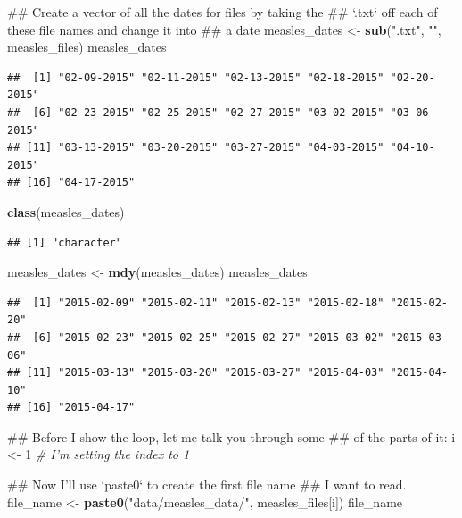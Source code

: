 \documentclass[]{book}
\makeatletter
\newenvironment{Shaded}{\begin{snugshade}}{\end{snugshade}}
\newcommand{\KeywordTok}[1]{\textcolor[rgb]{0.13,0.29,0.53}{\textbf{{#1}}}}
\newcommand{\DecValTok}[1]{\textcolor[rgb]{0.00,0.00,0.81}{{#1}}}
\newcommand{\StringTok}[1]{\textcolor[rgb]{0.31,0.60,0.02}{{#1}}}
\newcommand{\CommentTok}[1]{\textcolor[rgb]{0.56,0.35,0.01}{\textit{{#1}}}}
\newcommand{\NormalTok}[1]{{#1}}
\newenvironment{kframe}{%
\medskip{}
\setlength{\fboxsep}{.8em}
 \def\at@end@of@kframe{}%
 \ifinner\ifhmode%
  \def\at@end@of@kframe{\end{minipage}}%
  \begin{minipage}{\columnwidth}%
 \fi\fi%
 \def\FrameCommand##1{\hskip\@totalleftmargin \hskip-\fboxsep
 \colorbox{shadecolor}{##1}\hskip-\fboxsep
     \hskip-\linewidth \hskip-\@totalleftmargin \hskip\columnwidth}%
 \MakeFramed {\advance\hsize-\width
   \@totalleftmargin\z@ \linewidth\hsize
   \@setminipage}}%
 {\par\unskip\endMakeFramed%
 \at@end@of@kframe}
\renewenvironment{Shaded}{\begin{kframe}}{\end{kframe}}
\makeatother
\begin{document}
\begin{Shaded}
\begin{Highlighting}[]
\NormalTok{## Create a vector of all the dates for files by taking the }
\NormalTok{## `.txt` off each of these file names and change it into}
\NormalTok{## a date}
\NormalTok{measles_dates <-}\StringTok{ }\KeywordTok{sub}\NormalTok{(}\StringTok{".txt"}\NormalTok{, }\StringTok{""}\NormalTok{, measles_files)}
\NormalTok{measles_dates}
\end{Highlighting}
\end{Shaded}

\begin{verbatim}
##  [1] "02-09-2015" "02-11-2015" "02-13-2015" "02-18-2015" "02-20-2015"
##  [6] "02-23-2015" "02-25-2015" "02-27-2015" "03-02-2015" "03-06-2015"
## [11] "03-13-2015" "03-20-2015" "03-27-2015" "04-03-2015" "04-10-2015"
## [16] "04-17-2015"
\end{verbatim}

\begin{Shaded}
\begin{Highlighting}[]
\KeywordTok{class}\NormalTok{(measles_dates)}
\end{Highlighting}
\end{Shaded}

\begin{verbatim}
## [1] "character"
\end{verbatim}

\begin{Shaded}
\begin{Highlighting}[]
\NormalTok{measles_dates <-}\StringTok{ }\KeywordTok{mdy}\NormalTok{(measles_dates)}
\NormalTok{measles_dates}
\end{Highlighting}
\end{Shaded}

\begin{verbatim}
##  [1] "2015-02-09" "2015-02-11" "2015-02-13" "2015-02-18" "2015-02-20"
##  [6] "2015-02-23" "2015-02-25" "2015-02-27" "2015-03-02" "2015-03-06"
## [11] "2015-03-13" "2015-03-20" "2015-03-27" "2015-04-03" "2015-04-10"
## [16] "2015-04-17"
\end{verbatim}

\begin{Shaded}
\begin{Highlighting}[]
\NormalTok{## Before I show the loop, let me talk you through some }
\NormalTok{## of the parts of it:}
\NormalTok{i <-}\StringTok{ }\DecValTok{1} \CommentTok{# I'm setting the index to 1}

\NormalTok{## Now I'll use `paste0` to create the first file name}
\NormalTok{## I want to read.}
\NormalTok{file_name <-}\StringTok{ }\KeywordTok{paste0}\NormalTok{(}\StringTok{"data/measles_data/"}\NormalTok{, measles_files[i])}
\NormalTok{file_name}
\end{Highlighting}
\end{Shaded}
\end{document}
